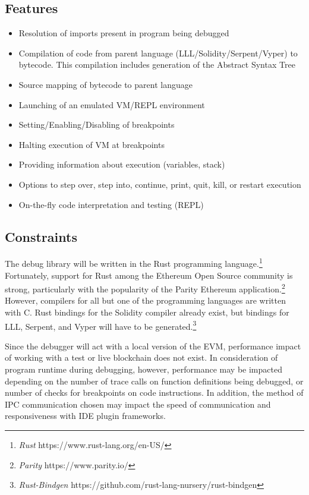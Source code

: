 \documentclass[]{article}
\begin{document}
\subsection{Features}
\begin{itemize}
\item Resolution of imports present in program being debugged
\item Compilation of code from parent language (LLL/Solidity/Serpent/Vyper) to bytecode. This compilation includes generation of the Abstract Syntax Tree
\item Source mapping of bytecode to parent language
\item Launching of an emulated VM/REPL environment
\item Setting/Enabling/Disabling of breakpoints
\item Halting execution of VM at breakpoints
\item Providing information about execution (variables, stack)
\item Options to step over, step into, continue, print, quit, kill, or restart execution
\item On-the-fly code interpretation and testing (REPL)
\end{itemize}

\subsection{Constraints}
The debug library will be written in the Rust programming language.\footnote{\textit{Rust} https://www.rust-lang.org/en-US/} Fortunately, support for Rust among the Ethereum Open Source community is strong, particularly with the popularity of the Parity Ethereum application.\footnote{\textit{Parity} https://www.parity.io/} However, compilers for all but one of the programming languages are written with C. Rust bindings for the Solidity compiler already exist, but bindings for LLL, Serpent, and Vyper will have to be generated.\footnote{\textit{Rust-Bindgen} https://github.com/rust-lang-nursery/rust-bindgen}

Since the debugger will act with a local version of the EVM, performance impact of working with a test or live blockchain does not exist. In consideration of program runtime during debugging, however, performance may be impacted depending on the number of trace calls on function definitions being debugged, or number of checks for breakpoints on code instructions. In addition, the method of IPC communication chosen may impact the speed of communication and responsiveness with IDE plugin frameworks.
\end{document}
